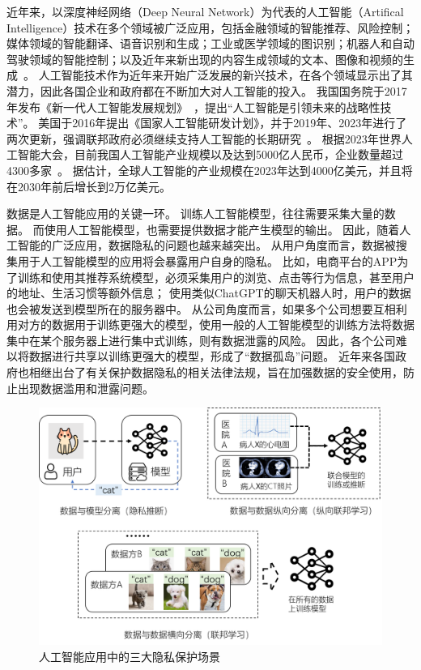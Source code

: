 近年来，以深度神经网络（Deep Neural Network）为代表的人工智能（Artifical Intelligence）技术在多个领域被广泛应用，包括金融领域的智能推荐、风险控制；媒体领域的智能翻译、语音识别和生成；工业或医学领域的图识别；机器人和自动驾驶领域的智能控制；以及近年来新出现的内容生成领域的文本、图像和视频的生成~\cite{lecun2015deep_learning,zhang2021ai_survey,wang2023chatgpt_survey}。
%
人工智能技术作为近年来开始广泛发展的新兴技术，在各个领域显示出了其潜力，因此各国企业和政府都在不断加大对人工智能的投入。
%
我国国务院于2017年发布《新一代人工智能发展规划》~\cite{china2017ai_plan}，提出“人工智能是引领未来的战略性技术”。
%
美国于2016年提出《国家人工智能研发计划》，并于2019年、2023年进行了两次更新，强调联邦政府必须继续支持人工智能的长期研究~\cite{usa2023ai_plan}。
%
根据2023年世界人工智能大会，目前我国人工智能产业规模以及达到5000亿人民币，企业数量超过4300多家~\cite{2023china_ai_conf}。
%
据估计，全球人工智能的产业规模在2023年达到4000亿美元，并且将在2030年前后增长到2万亿美元。

%
数据是人工智能应用的关键一环。
%
训练人工智能模型，往往需要采集大量的数据。
而使用人工智能模型，也需要提供数据才能产生模型的输出。
%
因此，随着人工智能的广泛应用，数据隐私的问题也越来越突出。
%
从用户角度而言，数据被搜集用于人工智能模型的应用将会暴露用户自身的隐私。
%
比如，电商平台的APP为了训练和使用其推荐系统模型，必须采集用户的浏览、点击等行为信息，甚至用户的地址、生活习惯等额外信息；
使用类似ChatGPT的聊天机器人时，用户的数据也会被发送到模型所在的服务器中。
%
从公司角度而言，如果多个公司想要互相利用对方的数据用于训练更强大的模型，使用一般的人工智能模型的训练方法将数据集中在某个服务器上进行集中式训练，则有数据泄露的风险。
因此，各个公司难以将数据进行共享以训练更强大的模型，形成了“数据孤岛”问题。
%
近年来各国政府也相继出台了有关保护数据隐私的相关法律法规，旨在加强数据的安全使用，防止出现数据滥用和泄露问题。




\begin{figure}[h]
    \centering
    \includegraphics[width=1\linewidth]{Z_Resources/PPML-overview.png}
    \caption{人工智能应用中的三大隐私保护场景}
    \label{fig:intro:ppml-overview}
\end{figure}


